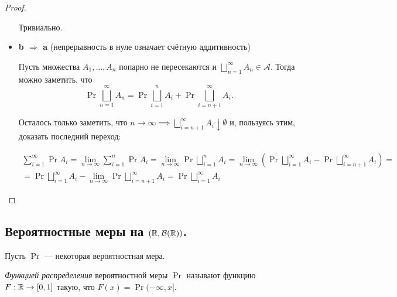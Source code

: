 \begin{proof}
\begin{itemize}
            Тривиально.

        \item \textbf{b $\Rightarrow$ a} (непрерывность в нуле означает счётную аддитивность)

            Пусть множества $A_1, \ldots, A_n$ попарно не пересекаются и $\bigsqcup\limits_{n=1}^{\infty}A_n
            \in \mathcal{A}$. Тогда можно заметить, что
            \[
                \Pr{\bigsqcup\limits_{n=1}^{\infty}A_n} =
                \Pr{\bigsqcup\limits_{i=1}^{n}A_i} +
                \Pr{\bigsqcup\limits_{i=n+1}^{\infty}A_i}.
            \]

            Осталось только заметить, что $n\to\infty \implies \bigsqcup\limits_{i=n+1}^{\infty}A_i
            \downarrow \emptyset$ и, пользуясь этим, доказать последний переход:

            \begin{multline*}
                \sum\limits_{i = 1}^{\infty}\Pr{A_i} =
                \lim\limits_{n\to\infty} \sum\limits_{i = 1}^{n}\Pr{A_i} =
                \lim\limits_{n\to\infty} \Pr{\bigsqcup\limits_{i = 1}^{n}A_i} =
                \lim\limits_{n\to\infty} \left(
                    \Pr{\bigsqcup\limits_{i = 1}^{\infty}A_i} -
                    \Pr{\bigsqcup\limits_{i = n+1}^{\infty}A_i}
                \right) =\\=
                \Pr{\bigsqcup\limits_{i = 1}^{\infty}A_i} -
                \lim\limits_{n\to\infty} \Pr{\bigsqcup\limits_{i = n+1}^{\infty}A_i} =
                \Pr{\bigsqcup\limits_{i = 1}^{\infty}A_i}
            \end{multline*}
    \end{itemize}
\end{proof}


\subsection{Вероятностные меры на $\left( \mathbb{R}, \mathcal{B}(\mathbb{R}) \right)$.}
    Пусть $\Pr$ --- некоторая вероятностная мера.

    \begin{definition}
        \emph{Функцией распределения} вероятностной меры $\Pr$ называют функцию $F: \mathbb{R} \to [0, 1]$ такую, что
        $F(x) = \Pr{(-\infty, x]}$.
    \end{definition}


